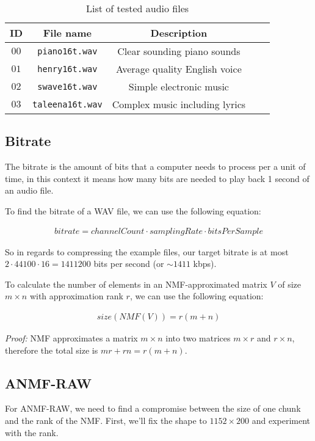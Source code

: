 \begin{table}[htbp]\caption{List of tested audio files}
	\label{tab:audio_examples}
	\centering
	\begin{tabular}{|c|c|c|c|l|}
		\hline
		ID & File name & Description \\ \hline
		$00$ & \verb|piano16t.wav| & Clear sounding piano sounds \\
		$01$ & \verb|henry16t.wav| & Average quality English voice \\
		$02$ & \verb|swave16t.wav| & Simple electronic music \\
		$03$ & \verb|taleena16t.wav| & Complex music including lyrics \\
		\hline
	\end{tabular}
\end{table}

\subsection{Bitrate}
The bitrate is the amount of bits that a computer needs to process per a unit of time, in this context it means how many bits are needed to play back 1 second of an audio file.

To find the bitrate of a WAV file, we can use the following equation:

\begin{align}
bitrate = channelCount \cdot samplingRate \cdot bitsPerSample
\end{align}

So in regards to compressing the example files, our target bitrate is at most $2 \cdot 44100 \cdot 16 = 1411200$ bits per second (or $\sim 1411$ kbps).

To calculate the number of elements in an NMF-approximated matrix $V$ of size $m \times n$ with approximation rank $r$, we can use the following equation:

\begin{align}
\label{equ:nmf_size}
size(NMF(V)) = r(m+n)
\end{align}

\emph{Proof:} NMF approximates a matrix $m \times n$ into two matrices $m \times r$ and $r \times n$, therefore the total size is $mr + rn = r(m+n)$.

\subsection{ANMF-RAW}
For ANMF-RAW, we need to find a compromise between the size of one chunk and the rank of the NMF. First, we'll fix the shape to $1152 \times 200$ and experiment with the rank.

